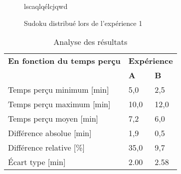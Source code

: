 \documentclass[12pt,fleqn,oneside,openany]{book} %
\begin{document}

\begin{figure}[h!]
\centering
\begin{minipage}[t]{.49\textwidth}
		\caption{lscaqlqélcjqwd}
\end{minipage}
\hfill
\begin{minipage}[t]{.49\textwidth}
		\caption{Sudoku distribué lors de l'expérience 1}
\end{minipage}
\end{figure}

\begin{table}[h!]
	\centering
	\caption{Analyse des résultats} \label{tbl:analyse1.1}
	\begin{tabular}{lll}
		\toprule
		\textbf{En fonction du temps perçu} & \multicolumn{2}{r}{\textbf{Expérience}} \\ 
		& \textbf{A} & \textbf{B} \\ \midrule
		Temps perçu minimum [min] & 5,0 & 2,5 \\ 
		Temps perçu maximum [min] & 10,0 & 12,0 \\
		Temps perçu moyen [min] & 7,2 & 6,0 \\
		Différence absolue [min] & 1,9 & 0,5 \\ 
		Différence relative [\%] & 35,0 & 9,7 \\ 
		Écart type [min] & 2.00 & 2.58 \\ \bottomrule
	\end{tabular}
\end{table}

	
\end{document}

